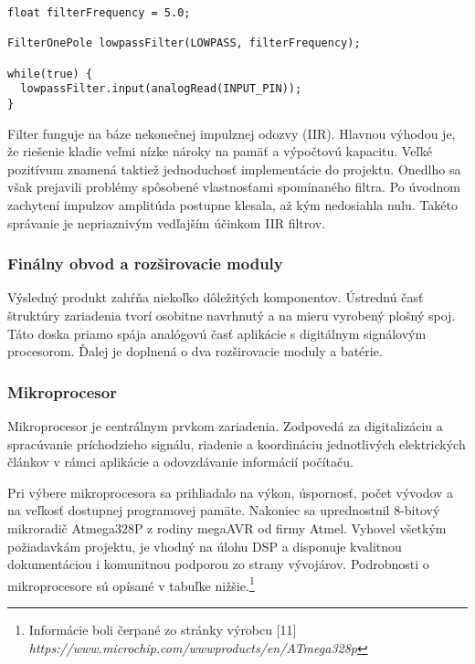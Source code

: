 \documentclass[titlepage,12pt]{article}
\begin{document}
\begin{lstlisting}
float filterFrequency = 5.0; 

FilterOnePole lowpassFilter(LOWPASS, filterFrequency);

while(true) {
  lowpassFilter.input(analogRead(INPUT_PIN));
}
\end{lstlisting}

Filter funguje na báze nekonečnej impulznej odozvy (IIR). Hlavnou výhodou je, že riešenie kladie veľmi nízke nároky na pamäť a výpočtovú kapacitu. Veľké pozitívum znamená taktiež jednoduchosť implementácie do projektu. Onedlho sa však prejavili problémy spôsobené vlastnosťami spomínaného filtra. Po úvodnom zachytení impulzov amplitúda postupne klesala, až kým nedosiahla nulu. Takéto správanie je nepriaznivým vedľajším účinkom IIR filtrov. 

\newpage
\subsubsection{Finálny obvod a rozširovacie moduly}
Výsledný produkt zahŕňa niekoľko dôležitých komponentov. Ústrednú časť štruktúry zariadenia tvorí osobitne navrhnutý a na mieru vyrobený plošný spoj. Táto doska priamo spája analógovú časť aplikácie s digitálnym signálovým procesorom. Ďalej je doplnená o dva rozširovacie \linebreak moduly a batérie.

\subsubsection*{Mikroprocesor}
Mikroprocesor je centrálnym prvkom zariadenia. Zodpovedá za digitalizáciu a spracúvanie príchodzieho signálu, riadenie a koordináciu jednotlivých elektrických článkov v rámci aplikácie a odovzdávanie informácií počítaču.

Pri výbere mikroprocesora sa prihliadalo na výkon, úspornosť, počet vývodov a na veľkosť dostupnej programovej pamäte. Nakoniec sa uprednostnil 8-bitový mikroradič Atmega328P z rodiny megaAVR od firmy Atmel. Vyhovel všetkým požiadavkám projektu, je vhodný na úlohu DSP a disponuje kvalitnou dokumentáciou i komunitnou podporou zo strany vývojárov. 
Podrobnosti o mikroprocesore sú opísané v tabuľke nižšie.\footnote{Informácie boli čerpané zo stránky výrobcu [11] \textit{https://www.microchip.com/wwwproducts/en/ATmega328p}}
\end{document}
